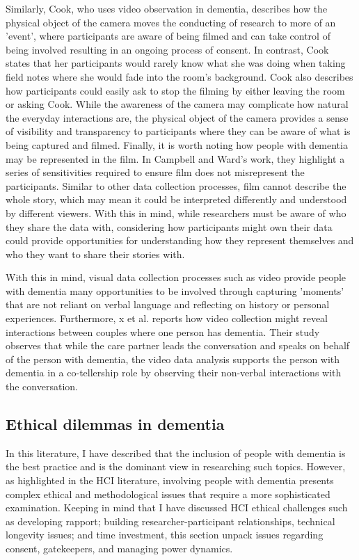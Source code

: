 Similarly, Cook, who uses video observation in dementia, describes how the physical object of the camera moves the conducting of research to more of an 'event', where participants are aware of being filmed and can take control of being involved resulting in an ongoing process of consent. In contrast, Cook states that her participants would rarely know what she was doing when taking field notes where she would fade into the room's background. Cook also describes how participants could easily ask to stop the filming by either leaving the room or asking Cook. While the awareness of the camera may complicate how natural the everyday interactions are, the physical object of the camera provides a sense of visibility and transparency to participants where they can be aware of what is being captured and filmed. Finally, it is worth noting how people with dementia may be represented in the film. In Campbell and Ward's work, they highlight a series of sensitivities required to ensure film does not misrepresent the participants. Similar to other data collection processes, film cannot describe the whole story, which may mean it could be interpreted differently and understood by different viewers. With this in mind, while researchers must be aware of who they share the data with, considering how participants might own their data could provide opportunities for understanding how they represent themselves and who they want to share their stories with.

With this in mind, visual data collection processes such as video provide people with dementia many opportunities to be involved through capturing 'moments' that are not reliant on verbal language and reflecting on history or personal experiences. Furthermore, x et al. reports how video collection might reveal interactions between couples where one person has dementia. Their study observes that while the care partner leads the conversation and speaks on behalf of the person with dementia, the video data analysis supports the person with dementia in a co-tellership role by observing their non-verbal interactions with the conversation.


\subsection{Ethical dilemmas in dementia}
\label{BL:EthicalDilemmas}
In this literature, I have described that the inclusion of people with dementia is the best practice and is the dominant view in researching such topics. However, as highlighted in the HCI literature, involving people with dementia presents complex ethical and methodological issues that require a more sophisticated examination. Keeping in mind that I have discussed HCI ethical challenges such as developing rapport; building researcher-participant relationships, technical longevity issues; and time investment, this section unpack issues regarding consent, gatekeepers, and managing power dynamics.


